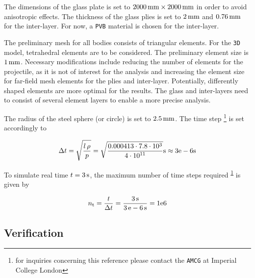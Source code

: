 \documentclass[format=acmtog,12pt,screen=true,review=false,natbib=false,]{acmart}
\begin{document}
\bigbreak
The dimensions of the glass plate is set to $2000\,{\rm{mm}}\times2000\,{\rm{mm}}$ in order to avoid anisotropic effects. The thickness of the glass plies is set to $2\,{\rm{mm}}$ and $0.76\,{\rm{mm}}$ for the inter-layer. For now, a \texttt{PVB} material is chosen for the inter-layer.

\bigbreak
The preliminary mesh for all bodies consists of triangular elements. For the \texttt{3D} model, tetrahedral elements \cite{Che18} are to be considered. The preliminary element size is $1\,{\rm{mm}}$. Necessary modifications include reducing the number of elements for the projectile, as it is not of interest for the analysis and increasing the element size for far-field mesh elements for the plies and inter-layer. Potentially, differently shaped elements are more optimal for the results. The glass and inter-layers need to consist of several element layers to enable a more precise analysis. 

\bigbreak
The radius of the steel sphere (or circle) is set to $2.5\,{\rm{mm}}$. The time step \cite{Far19}\footnote{\label{DEMPlus} for inquiries concerning this reference please contact the \texttt{AMCG} at Imperial College London} is set accordingly to

\begin{equation}
\label{eq:deltat}
\Delta t=\sqrt{\frac{l\,\rho}{p}}=\sqrt{\frac{0.000413\cdot7.8\cdot10^3}{4\cdot{10}^{11}}}{\rm{s}}\approx3\rm{e}-6{\rm{s}}
\end{equation}

\addtocounter{footnote}{-2}

To simulate real time $t=3\,{\rm{s}}$, the maximum number of time steps required \cite{Far19}\textsuperscript{\ref{DEMPlus}} is given by

\begin{equation}
    \label{eq:nt}
    n_{\rm{t}}=\frac{t}{\Delta t}=\frac{3\,{\rm{s}}}{3\,{\rm{e}}-6\,{\rm{s}}}=1{\rm{e}}6
\end{equation}

\subsection{Verification}
\label{subsec:Verification}
\end{document}
